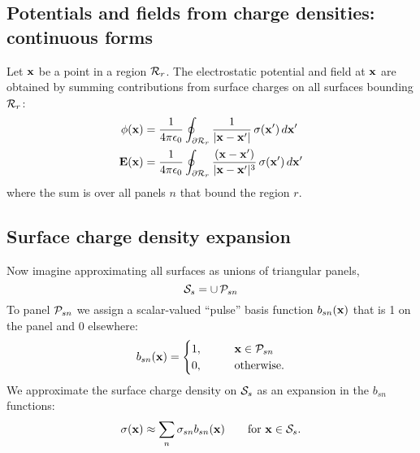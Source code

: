 \documentclass[letterpaper]{article}
\begin{document}
\subsection*{Potentials and fields from charge densities: 
             continuous forms} 

Let $\mathbf{x}$ be a point in a region $\mathcal{R}_r$. The electrostatic potential 
and field at $\mathbf{x}$ are obtained by summing contributions from
surface charges on all surfaces bounding $\mathcal{R}_r$: 
\begin{align*}
\phi(\mathbf{x}) 
&= \frac{1}{4\pi\epsilon_0} 
   \oint_{\partial \mathcal{R}_r} 
   \frac{1}{|\mathbf{x} - \mathbf{x}^\prime|}
           \,\sigma(\mathbf{x}^\prime) \, d\mathbf{x}^\prime
\\
\mathbf{E}(\mathbf{x}) 
&= \frac{1}{4\pi\epsilon_0}
   \oint_{\partial \mathcal{R}_r} 
   \frac{(\mathbf{x}-\mathbf{x}^\prime)}
        {|\mathbf{x} - \mathbf{x}^\prime|^3}
        \,\sigma(\mathbf{x}^\prime)\,d\mathbf{x}^\prime
\end{align*}
where the sum is over all panels $n$ that bound the region $r$.

\subsection*{Surface charge density expansion}

Now imagine approximating all surfaces as unions 
of triangular panels, 
$$ \mathcal{S}_{s} = \cup \, \mathcal{P}_{sn}$$
To panel $\mathcal{P}_{sn}$ we assign a scalar-valued 
``pulse'' basis function $b_{sn}(\mathbf{x})$ that is 
1 on the panel and 0 elsewhere:
$$ b_{sn}(\mathbf{x}) = 
   \begin{cases}
    1, \qquad &\mathbf{x} \in \mathcal{P}_{sn} \\
    0, \qquad &\text{otherwise}.
  \end{cases}
$$
We approximate the surface charge density on $\mathcal{S}_s$
as an expansion in the $b_{sn}$ functions:
$$ \sigma(\mathbf{x}) \approx \sum_n \sigma_{sn} b_{sn}(\mathbf{x})
   \qquad 
   \text{for }\mathbf{x}\in \mathcal{S}_s.
$$
\end{document}
